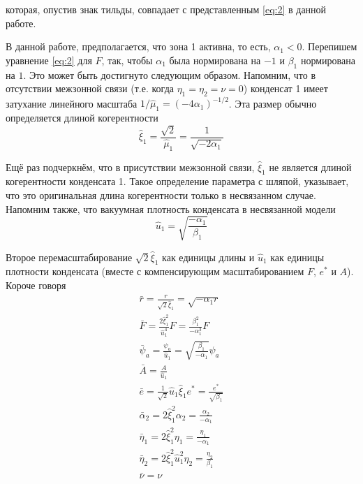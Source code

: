 которая, опустив знак тильды, совпадает с представленным \eqref{eq:2} в
данной работе.

В данной работе, предполагается, что зона 1 активна, то есть, 
\( \alpha_1 < 0 \). Перепишем уравнение \eqref{eq:2} для \( F \), так, чтобы 
\( \alpha_1 \) была нормирована на \( -1 \) и \( \beta_1 \) нормирована на 
\( 1 \). Это может быть достигнуто следующим образом. Напомним, что в 
отсутствии межзонной связи (т.е. когда \( \eta_1 = \eta_2 = \nu = 0 \)) 
конденсат 1 имеет затухание линейного масштаба 
\( 1/\hat{\mu}_1 = (-4\alpha_1)^{-1/2} \). Эта размер обычно определяется 
длиной когерентности
\begin{equation}
    \hat{\xi}_1 = \frac{\sqrt{2}}{\hat{\mu}_1} = \frac{1}{\sqrt{-2\alpha_1}}
    \label{eq:A-4}
\end{equation}

Ещё раз подчеркнём, что в присутствии межзонной связи, \( \hat{\xi}_1 \) не
является длиной когерентности конденсата 1. Такое определение параметра с 
шляпой, указывает, что это оригинальная длина когерентности только в 
несвязанном случае. Напомним также, что вакуумная плотность конденсата в 
несвязанной модели
\begin{equation}
    \hat{u}_1 = \sqrt{\frac{-\alpha_1}{\beta_1}}
    \label{eq:B-5}
\end{equation}

Второе перемасштабирование \( \sqrt{2}\hat{\xi}_1 \) как единицы длины
и \( \hat{u}_1 \) как единицы плотности конденсата (вместе с компенсирующим
масштабированием \( F \), \( e^* \) и \( A \)). Короче говоря
\begin{gather}
  \bar{r} = \frac{r}{\sqrt{2}\hat{\xi}_1} = \sqrt{-\alpha_1 r} \nonumber \\
  \bar{F} = \frac{2\hat{\xi}^2_1}{\hat{u}^4_1}F =
    \frac{\beta^2_1}{-\alpha^3_1}F \nonumber \\
  \bar{\psi}_a = \frac{\psi_a}{\hat{u}_1} =
    \sqrt{\frac{\beta_1}{-\alpha_1}}\psi_a \nonumber \\
  \bar{A} = \frac{A}{\hat{u}_1} \\
  \bar{e} = \frac{1}{\sqrt{2}}\hat{u}_1\hat{\xi}_1 e^* =
    \frac{e^*}{\sqrt{\beta_1}} \nonumber \\
  \bar{\alpha}_2 = 2\hat{\xi}^2_1 \alpha_2 = \frac{\alpha_2}{-\alpha_1}
    \nonumber \\
  \bar{\eta}_1 = 2\hat{\xi}^2_1 \eta_1 = \frac{\eta_1}{-\alpha_1} \nonumber \\
  \bar{\eta}_2 = 2\hat{\xi}^2_1 \hat{u}^2_1 \eta_2 =
    \frac{\eta_2}{\beta_1} \nonumber \\
  \bar{\nu} = \nu \label{eq:B-6}
\end{gather}

